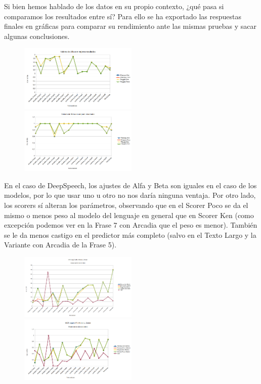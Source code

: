 Si bien hemos hablado de los datos en su propio contexto, ¿qué pasa si comparamos los resultados entre sí? Para ello se ha exportado las respuestas finales en gráficas para comparar su rendimiento ante las mismas pruebas y sacar algunas conclusiones.

\begin{figure}[H]
	\includegraphics[width=0.5\textwidth]{imagenes/Alfas.png} \hfill \includegraphics[width=0.5\textwidth]{imagenes/Betas.png}
\end{figure}

En el caso de DeepSpeech, los ajustes de Alfa y Beta son iguales en el caso de los modelos, por lo que usar uno u otro no nos daría ninguna ventaja. Por otro lado, los scorers sí alteran los parámetros, observando que en el Scorer Poco se da el mismo o menos peso al modelo del lenguaje en general que en Scorer Ken (como excepción podemos ver en la Frase 7 con Arcadia que el peso es menor). También se le da menos castigo en el predictor más completo (salvo en el Texto Largo y la Variante con Arcadia de la Frase 5).

\begin{figure}[H]
	\includegraphics[width=0.5\textwidth]{imagenes/CERMedios.png} \hfill \includegraphics[width=0.5\textwidth]{imagenes/WERMedios.png}
\end{figure}

